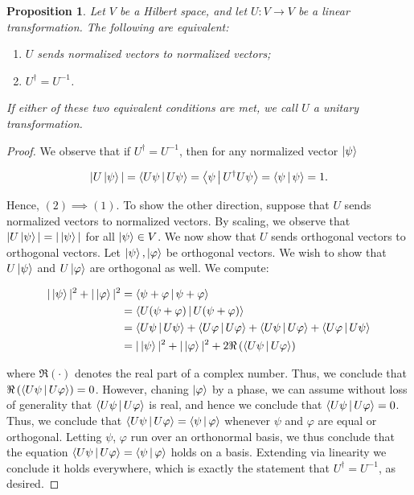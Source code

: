 \documentclass{article}
\newtheorem{proposition}{Proposition}[section]
\theoremstyle{definition}
\newcommand{\0}{\left|0\right>}
\newcommand{\1}{\left|1\right>}
\numberwithin{figure}{section}
\begin{document}
\begin{proposition}\label{unitary equivilance} Let $V$ be a Hilbert space, and let $U:V\to V$ be a linear transformation. The following are equivalent:

\begin{enumerate}
\item $U$ sends normalized vectors to normalized vectors;
\item $U^{\dagger}=U^{-1}$.
\end{enumerate}

If either of these two equivalent conditions are met, we call $U$ a unitary transformation.
\end{proposition}
\begin{proof} We observe that if $U^\dagger=U^{-1}$, then for any normalized vector $\ket{\psi}$

$$|U\ket{\psi}|=\Braket{U \psi | U \psi}=\Braket{\psi | U^\dagger U \psi}=\Braket{\psi | \psi} =1.$$

Hence, $(2)\implies (1)$. To show the other direction, suppose that $U$ sends normalized vectors to normalized vectors. By scaling, we observe that $|U\ket{\psi}|=|\ket{\psi}|$ for all $\ket{\psi}\in V$. We now show that $U$ sends orthogonal vectors to orthogonal vectors. Let $\ket{\psi},\ket{\varphi}$ be orthogonal vectors. We wish to show that $U\ket{\psi}$ and $U\ket{\varphi}$ are orthogonal as well. We compute:

\begin{align*}
|\ket{\psi}|^2+|\ket{\varphi}|^2&=\Braket{\psi+\varphi | \psi+ \varphi}\\
&=\Braket{U(\psi+\varphi) | U(\psi+ \varphi)}\\
&=\Braket{U\psi | U\psi}+\Braket{U\varphi | U \varphi}+\Braket{U\psi | U\varphi}+\Braket{U\varphi | U\psi}\\
&=|\ket{\psi}|^2+|\ket{\varphi}|^2+2\Re\left(\Braket{U\psi | U\varphi}\right)\\
\end{align*}

where $\Re(\cdot)$ denotes the real part of a complex number. Thus, we conclude that $\Re\left(\Braket{U\psi | U\varphi}\right)=0$. However, chaning $\ket{\varphi}$ by a phase, we can assume without loss of generality that $\Braket{U\psi | U\varphi}$ is real, and hence we conclude that $\Braket{U\psi | U\varphi}=0$. Thus, we conclude that $\Braket{U\psi | U\varphi}=\Braket{\psi | \varphi}$ whenever $\psi$ and $\varphi$ are equal or orthogonal. Letting $\psi$, $\varphi$ run over an orthonormal basis, we thus conclude that the equation $\Braket{U\psi | U\varphi}=\Braket{\psi | \varphi}$ holds on a basis. Extending via linearity we conclude it holds everywhere, which is exactly the statement that $U^\dagger=U^{-1}$, as desired. 
\end{proof}
\end{document}
